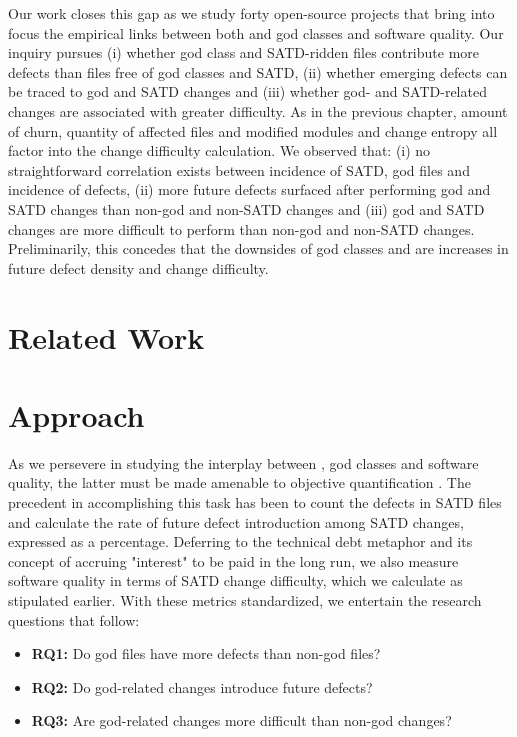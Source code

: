 Our work closes this gap as we study forty open-source projects that bring into focus the empirical links between both \SATD and god classes and software quality. Our inquiry pursues (i) whether god class and SATD-ridden files contribute more defects than files free of god classes and SATD, (ii) whether emerging defects can be traced to god and SATD changes and (iii) whether god- and SATD-related changes are associated with greater difficulty. As in the previous chapter, amount of churn, quantity of affected files and modified modules and change entropy all factor into the change difficulty calculation. We observed that: (i) no straightforward correlation exists between incidence of SATD, god files and incidence of defects, (ii) more future defects surfaced after performing god and SATD changes than non-god and non-SATD changes and (iii) god and SATD changes are more difficult to perform than non-god and non-SATD changes. Preliminarily, this concedes that the downsides of god classes and \SATD are increases in future defect density and change difficulty.


\section{Related Work}
\label{chap4:sec:related_work}

\section{Approach}
\label{chap4:sec:approach}
As we persevere in studying the interplay between \SATD, god classes and software quality, the latter must be made amenable to objective quantification \cite{Kamei-tse-2013,Kim-tse-2008,sliwerski-msr-2005}. The precedent in accomplishing this task has been to count the defects in SATD files and calculate the rate of future defect introduction among SATD changes, expressed as a percentage. Deferring to the technical debt metaphor and its concept of accruing "interest" to be paid in the long run, we also measure software quality in terms of SATD change difficulty, which we calculate as stipulated earlier. With these metrics standardized, we entertain the research questions that follow:

\begin{itemize}
	\vspace{0.2cm}
	\item {\bf RQ1:} Do god files have more defects than non-god files?\\
	\item {\bf RQ2:} Do god-related changes introduce future defects?\\
	\item {\bf RQ3:} Are god-related changes more difficult than non-god changes?
\end{itemize}

